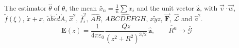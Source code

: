 \documentclass{article}
\newcommand{\vect}[1]{\mathbf{#1}}
\begin{document}
The estimator $\hat\theta$ of $\theta$, the mean $\bar{x}_n = \frac{1}{n}\sum x_i$ and the unit vector $\hat{\vect{z}}$,
with $\vec v\cdot\vec w$, $\tilde{f}(\xi)$, $\dot x + \ddot x$, $\check{a}\breve{b}\acute{c}\grave{d}\mathring{A}$,
$\hat x^2$, $\bar{f}_i^2$, $\widehat{AB}$, $\widehat{ABCDEFGH}$, $\widetilde{xyz}$, $\mathbf{\vec F}$, $\mathcal{\hat L}$ and ${\hat a}^2$.
\begin{equation}
  \vect{E}(z) = \frac{1}{4\pi\varepsilon_0}\frac{Qz}{(z^2+R^2)^{3/2}}\,\hat{\vect{z}}, \qquad \widetilde{R^n} \to \bar{\mathcal{G}}
\end{equation}
\end{document}
